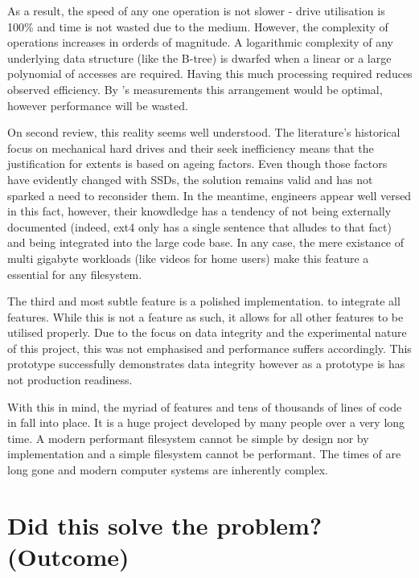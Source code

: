         As a result, the speed of any one operation is not slower - drive
        utilisation is 100\% and time is not wasted due to the medium. However,
        the complexity of operations increases in orderds of magnitude. A
        logarithmic complexity of any underlying data structure (like the
        B-tree) is dwarfed when a linear or a large polynomial of accesses are
        required. Having this much processing required reduces observed
        efficiency. By 's measurements this arrangement would
        be optimal, however performance will be wasted.

        On second review, this reality seems well understood. The literature's
        historical focus on mechanical hard drives and their seek inefficiency
        means that the justification for extents is based on ageing factors.
        Even though those factors have evidently changed with SSDs, the
        solution remains valid and has not sparked a need to reconsider them.
        In the meantime, engineers appear well versed in this fact, however,
        their knowdledge has a tendency of not being externally documented
        (indeed, ext4 only has a single sentence that alludes to that fact) and
        being integrated into the large code base. In any case, the mere
        existance of multi gigabyte workloads (like videos for home users) make
        this feature a essential for any filesystem.

        The third and most subtle feature is a polished implementation.  to
        integrate all features. While this is not a feature as such, it allows
        for all other features to be utilised properly. Due to the focus on
        data integrity and the experimental nature of this project, this was
        not emphasised and performance suffers accordingly. This prototype
        successfully demonstrates data integrity however as a prototype is has
        not production readiness.

        With this in mind, the myriad of features and tens of thousands of
        lines of code in  fall into place. It is a huge
        project developed by many people over a very long time. A modern
        performant filesystem cannot be simple by design nor by implementation
        and a simple filesystem cannot be performant. The times of
         are long gone and modern computer systems are
        inherently complex.

    \section{Did this solve the problem? (Outcome)}

